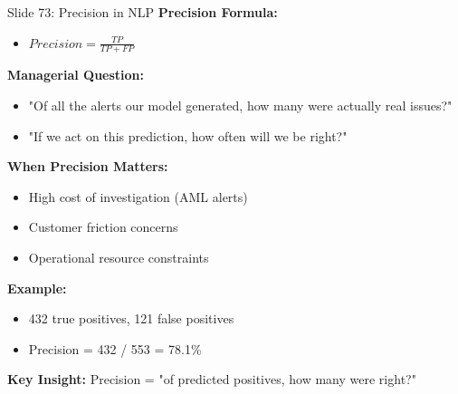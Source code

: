 \documentclass[8pt]{beamer}
\begin{document}
	\begin{frame}{Slide 73: Precision in NLP}
		\fontsize{6.5}{7.5}\selectfont
		\textbf{Precision Formula:}
		\begin{itemize}
			\item $Precision = \frac{TP}{TP + FP}$
		\end{itemize}
		
		\vspace{0.1cm}
		\textbf{Managerial Question:}
		\begin{itemize}
			\item "Of all the alerts our model generated, how many were actually real issues?"
			\item "If we act on this prediction, how often will we be right?"
		\end{itemize}
		
		\vspace{0.1cm}
		\textbf{When Precision Matters:}
		\begin{itemize}
			\item High cost of investigation (AML alerts)
			\item Customer friction concerns
			\item Operational resource constraints
		\end{itemize}
		
		\vspace{0.1cm}
		\textbf{Example:}
		\begin{itemize}
			\item 432 true positives, 121 false positives
			\item Precision = 432 / 553 = 78.1\%
		\end{itemize}
		
		\textcolor{myblue}{\textbf{Key Insight:}} Precision = "of predicted positives, how many were right?"
	\end{frame}
	
\end{document}
